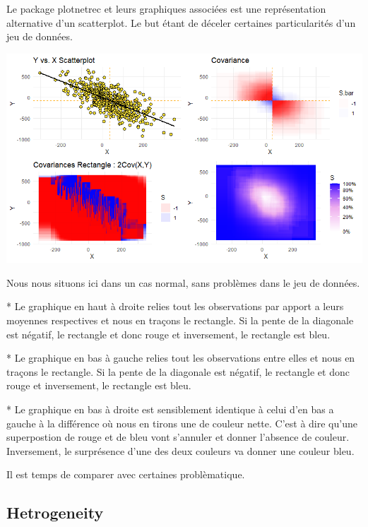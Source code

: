 \documentclass[
]{report}
\begin{document}
Le package plotnetrec et leurs graphiques associées est une représentation alternative d'un scatterplot. Le but étant de déceler certaines particularités d'un jeu de données.

\begin{minipage}{0.45\textwidth}
    \includegraphics{all.png}
\end{minipage} 
\hspace{3.5ex}
\begin{minipage}{0.45\textwidth}
Nous nous situons ici dans un cas normal, sans problèmes dans le jeu de données.

* Le graphique en haut à droite relies tout les observations par apport a leurs moyennes respectives et nous en traçons le rectangle. Si la pente de la diagonale est négatif, le rectangle et donc rouge et inversement, le rectangle est bleu.

* Le graphique en bas à gauche relies tout les observations entre elles et nous en traçons le rectangle. Si la pente de la diagonale est négatif, le rectangle et donc rouge et inversement, le rectangle est bleu.

* Le graphique en bas à droite est sensiblement identique à celui d'en bas a gauche à la différence où nous en tirons une de couleur nette. C'est à dire qu'une superpostion de rouge et de bleu vont s'annuler et donner l'absence de couleur. Inversement, le surprésence d'une des deux couleurs va donner une couleur bleu.

\end{minipage}

Il est temps de comparer avec certaines problèmatique.

\hypertarget{hetrogeneity}{%
\subsection{Hetrogeneity}\label{hetrogeneity}}
\end{document}
